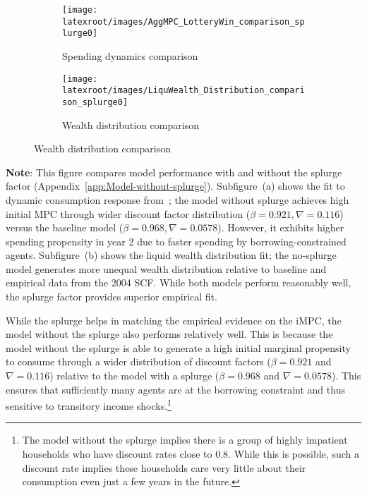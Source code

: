 \documentclass[qe]{econsocart}
\begin{document}
\begin{figure}[H]
  \centering
  \caption{Model performance with and without splurge factor}
  \label{fig:splurge0_Norwayestimation} 
    \centering
    \begin{subfigure}[b]{.5\linewidth}
      \centering
      \texttt{[image: \\latexroot/images/AggMPC\_LotteryWin\_comparison\_splurge0]}
      \caption{Spending dynamics comparison}
      \label{fig:aggmpclotterywin_splurge0} 
    \end{subfigure}
    \begin{subfigure}[b]{.5\linewidth}
      \centering
      \texttt{[image: \\latexroot/images/LiquWealth\_Distribution\_comparison\_splurge0]}
      \caption{Wealth distribution comparison}
      \label{fig:liquwealthdistribution_splurge0} 
    \end{subfigure}
\end{figure}
\noindent\parbox{\textwidth}{
  \medskip
  \footnotesize \textbf{Note}: This figure compares model performance with and without the splurge factor (Appendix~\ref{app:Model-without-splurge}).
  Subfigure~(a) shows the fit to dynamic consumption response from~\cite{fagereng-mpc-2021};
  the model without splurge achieves high initial MPC through wider discount factor distribution
  ($\beta = 0.921, \nabla = 0.116$) versus the baseline model ($\beta = 0.968, \nabla = 0.0578$).
  However, it exhibits higher spending propensity in year 2 due to faster spending by borrowing-constrained agents.
  Subfigure~(b) shows the liquid wealth distribution fit; the no-splurge model generates
  more unequal wealth distribution relative to baseline and empirical data from the 2004 SCF.
  While both models perform reasonably well, the splurge factor provides superior empirical fit.
}
\medskip\medskip


While the splurge helps in matching the empirical evidence on the iMPC, the model without the splurge also performs relatively well. This is because the model without the splurge is able to generate a high initial marginal propensity to consume through a wider distribution of discount factors ($\beta = 0.921$ and $\nabla=0.116$) relative to the model with a splurge ($\beta = 0.968$ and $\nabla=0.0578$). This ensures that sufficiently many agents are at the borrowing constraint and thus sensitive to transitory income shocks.\footnote{The model without the splurge implies there is a group of highly impatient households who have discount rates close to 0.8. While this is possible, such a discount rate implies these households care very little about their consumption even just a few years in the future.}
\end{document}
